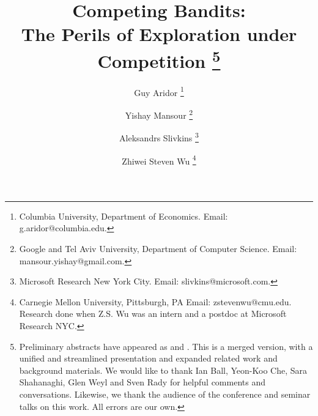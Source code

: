 \documentclass[12pt]{article}
\begin{document}

\title{\vspace{-12mm}Competing Bandits:\\
The Perils of Exploration under Competition%
\thanks{Preliminary abstracts have appeared as
\citet*{CompetingBandits-itcs18} and \citet*{CompetingBandits-ec19}.
This is a merged version, with a unified and streamlined presentation and expanded related work and background materials.  \newline \indent %
We would like to thank Ian Ball, Yeon-Koo Che, Sara Shahanaghi, Glen Weyl and Sven Rady for helpful comments and conversations. Likewise, we thank the audience of the conference and seminar talks on this work.
All errors are our own.}}


\author{Guy Aridor
\footnote{Columbia University, Department of Economics. Email: g.aridor@columbia.edu.}
\and \hspace{-0.75cm}
\rule{0.0in}{0pt}
Yishay Mansour
\footnote{Google and Tel Aviv University, Department of Computer Science. Email: mansour.yishay@gmail.com.}
\and \hspace{-0.75cm}
\rule{0.0in}{0pt}
Aleksandrs Slivkins%
\footnote{Microsoft Research New York City. Email: slivkins@microsoft.com.}
\and \hspace{-0.75cm}
\rule{0.0in}{0pt}
Zhiwei Steven Wu%
\footnote{Carnegie Mellon University, Pittsburgh, PA
Email: zstevenwu@cmu.edu.\newline
Research done when Z.S. Wu was an intern and a postdoc at Microsoft Research NYC.}
}
\date{}

\maketitle
\end{document}
